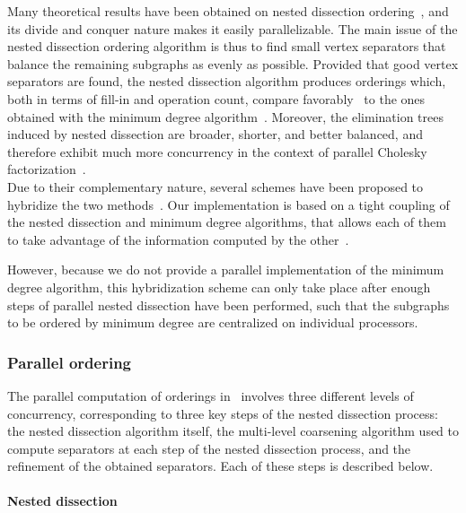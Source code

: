 Many theoretical results have been obtained on nested dissection
ordering~\cite{chro89,lirota79}, and its divide and conquer nature
makes it easily parallelizable. The main issue of the nested
dissection ordering algorithm is thus to find small vertex separators
that balance the remaining subgraphs as evenly as possible.
Provided that good vertex separators are found, the nested dissection
algorithm produces orderings which, both in terms of fill-in and
operation count, compare favorably~\cite{gukaku96,kaku95a,pero97a} to
the ones obtained with the minimum degree algorithm~\cite{liu-85}.
Moreover, the elimination trees induced by nested dissection are
broader, shorter, and better balanced, and therefore
exhibit much more concurrency in the context of parallel Cholesky
factorization~\cite[and included
references]{aseilish91,geng89,geheling88,gukaku96,pero97a,shre92}.
\\

Due to their complementary nature, several schemes have been proposed
to hybridize the two methods~\cite{hero98,kaku98a,pero97a}.
Our implementation is based on a tight coupling of the nested dissection
and minimum degree algorithms, that allows each of them to take
advantage of the information computed by the other~\cite{peroam00a}.

However, because we do not provide a parallel implementation of the
minimum degree algorithm, this hybridization scheme can only take
place after enough steps of parallel nested dissection have been
performed, such that the subgraphs to be ordered by minimum degree
are centralized on individual processors.

\subsubsection{Parallel ordering}
\label{sec-algo-parallel}

The parallel computation of orderings in \ptscotch\ involves three
different levels of concurrency, corresponding to three key steps of
the nested dissection process: the nested dissection algorithm itself,
the multi-level coarsening algorithm used to compute separators at
each step of the nested dissection process, and the refinement of the
obtained separators. Each of these steps is described below.

\paragraph{Nested dissection}

